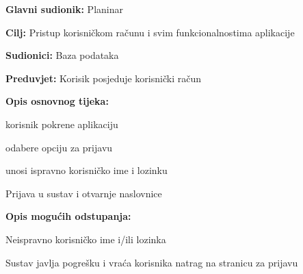 			\noindent {}
		\begin{packed_item}
			
			\item \textbf{Glavni sudionik: }$ $Planinar$ $
			\item  \textbf{Cilj:} $ $Pristup korisničkom računu i svim funkcionalnostima aplikacije$ $
			\item  \textbf{Sudionici:} $ $Baza podataka$ $
			\item  \textbf{Preduvjet:} $ $Korisik posjeduje korisnički račun$ $
			\item  \textbf{Opis osnovnog tijeka:}
			
			\item[] \begin{packed_enum}
				
				\item $ $korisnik pokrene aplikaciju$ $
				\item $ $odabere opciju za prijavu$ $
				\item $ $unosi ispravno korisničko ime i lozinku$ $
				\item $ $Prijava u sustav i otvarnje naslovnice$ $
				
			\end{packed_enum}
			
			\item  \textbf{Opis mogućih odstupanja:}
			
			\item[] \begin{packed_item}
				
				\item[3.a] $ $Neispravno korisničko ime i/ili lozinka $ $
				\item[] \begin{packed_enum}
					
					\item $ $Sustav javlja pogrešku i vraća korisnika natrag na stranicu za prijavu$ $
				\end{packed_enum}
			\end{packed_item}
		\end{packed_item}
		
